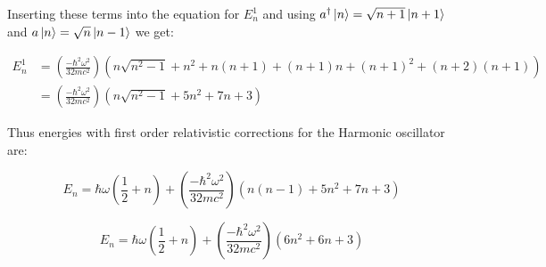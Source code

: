 Inserting these terms into the equation for $E^1_n$ and using $a^\dagger \ket{n} = \sqrt{n+1} \ket{n+1}$ and $a \ket{n} = \sqrt{n} \ket{n-1}$ we get:

\begin{equation}
\begin{split}
    E^1_n &=  \left( \frac{-\hbar^2 \omega^2}{32 m c^2} \right) \left( n\sqrt{n^2 - 1} + n^2 + n(n+1) + (n+1)n + (n+1)^2 + (n+2)(n+1) \right) \\
    &=  \left( \frac{-\hbar^2 \omega^2}{32 m c^2} \right) \left( n\sqrt{n^2 - 1} + 5n^2 + 7n + 3 \right) 
\end{split}
\end{equation}

Thus energies with first order relativistic corrections for the Harmonic oscillator are:

\begin{equation}
    E_n = \hbar \omega \left( \frac{1}{2} + n\right) + \left( \frac{-\hbar^2 \omega^2}{32 m c^2} \right) \left( n(n - 1) + 5n^2 + 7n + 3 \right) 
\end{equation}

\begin{equation}
    E_n = \hbar \omega \left( \frac{1}{2} + n\right) + \left( \frac{-\hbar^2 \omega^2}{32 m c^2} \right) \left( 6n^2 + 6n + 3 \right) 
\end{equation}
